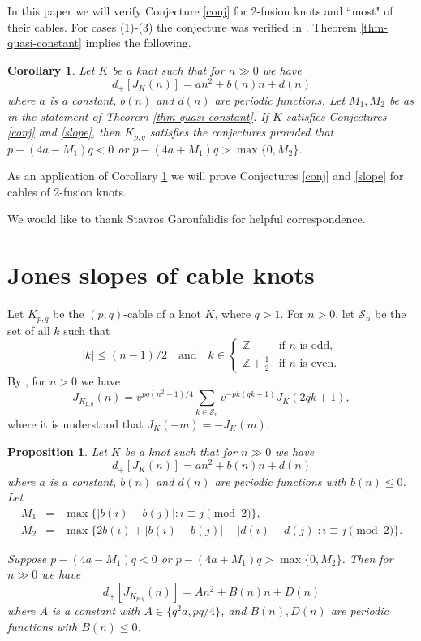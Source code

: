 \documentclass[11pt]{amsart}
\numberwithin{equation}{section}
\theoremstyle{plain}
\newtheorem{corollary}[theorem]{Corollary}
\newtheorem{proposition}[theorem]{Proposition}
\theoremstyle{definition}
\newcommand{\K}{{K_{p, q}}}
\def\BZ{\mathbb Z}
\def\CS{\mathcal S}
\begin{document}
In this paper we will verify Conjecture \ref{conj} for 2-fusion knots and ``most" of their cables. For cases (1)-(3) 
the conjecture was verified in  \cite{Effie-Anh-slope}.
Theorem \ref{thm-quasi-constant} implies the following.

\begin{corollary} \label{cables}
 Let $K$ be a knot such that for $n \gg 0$ we have
$$
d_+[J_K(n)]=an^2+b(n)n+d(n)
$$
where $a$ is a constant, $b(n)$ and $d(n)$ are periodic functions. Let $M_1, M_2$
be as in the statement of Theorem \ref{thm-quasi-constant}.
If $K$ satisfies Conjectures \ref{conj}  and  \ref{slope}, then
$\K$ satisfies the conjectures  provided that  $p- (4a-M_1)q < 0$ or $p- (4a + M_1)q > \max\{0,M_2\}$. 
 \end{corollary}

As an application of  Corollary \ref{cables} we will prove Conjectures \ref{conj}  and  \ref{slope}
for cables of 2-fusion knots.

We would like to thank Stavros Garoufalidis for helpful correspondence.

\section{Jones slopes of cable knots}

Let $K_{p,q}$ be the $(p,q)$-cable of a knot $K$, where $q > 1$. For $n>0$, let $\CS_n$ be the set of all $k$ such that 
 $$
 |k| \le (n-1)/2 \quad \text{and} \quad k \in \begin{cases} \BZ &\mbox{if } n \text{ is odd}, \\ 
 \BZ+\frac{1}{2} & \mbox{if } n \text{ is even}. \end{cases}
 $$
By \cite{Ve}, for $n>0$ we have
\begin{equation}
\label{cables11}
J_{K_{p,q}}(n)= v^{pq(n^2-1)/4} \sum_{k \in \CS_n} v^{-pk(qk+1)} J_K(2qk+1),
\end{equation} 
where it is understood that $J_K(-m)=-J_K(m)$.

\begin{proposition}
\label{quasi-constant}
Let $K$ be a knot such that for $n \gg 0$ we have
$$
d_+[J_K(n)]=an^2+b(n)n+d(n)
$$
where $a$ is a constant, $b(n)$ and $d(n)$ are periodic functions with $b(n) \le 0$. Let
\begin{eqnarray*}
M_1 &=&  \max\{|b(i)-b(j)| : i  \equiv j \pmod{2} \},\\
M_2 &=& \max\{2b(i) + |b(i)-b(j)| + |d(i)-d(j)| : i \equiv j \pmod{2}\}.
\end{eqnarray*}

Suppose $p- (4a-M_1)q < 0$ or $p- (4a + M_1)q > \max\{0,M_2\}$. Then for $n \gg 0$ we have
$$d_+[J_{\K}(n)]=An^2+B(n)n+D(n)$$
where $A$ is a constant with $A \in \{q^2a, pq/4\}$, and $B(n), D(n)$ are periodic functions with $B(n) \le 0$.
\end{proposition}
\end{document}
